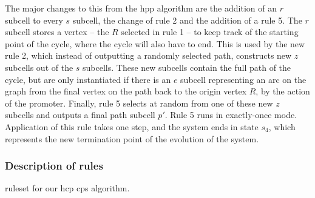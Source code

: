 The major changes to this from the \gls{hpp} algorithm are the addition of an \(r\) subcell to every \(s\) subcell, the change of rule 2 and the addition of a rule 5. The \(r\) subcell stores a vertex -- the \(R\) selected in rule 1 -- to keep track of the starting point of the cycle, where the cycle will also have to end.  This is used by the new rule 2, which instead of outputting a randomly selected path, constructs new \(z\) subcells out of the \(s\) subcells.  These new subcells contain the full path of the cycle, but are only instantiated if there is an \(e\) subcell representing an arc on the graph from the final vertex on the path back to the origin vertex \(R\), by the action of the promoter.  Finally, rule 5 selects at random from one of these new \(z\) subcells and outputs a final path subcell \(p'\).  Rule 5 runs in exactly-once mode.  Application of this rule takes one step, and the system ends in state \(s_4\), which represents the new termination point of the evolution of the system.

\subsubsection{Description of rules}

\begin{cprulesetfloat}
    \begin{cpruleset}
        
        
        
        
        
        
    \end{cpruleset}
    \caption[\Gls{ruleset} for the ]{\label{ruleset:tsp:hcp}\Gls{ruleset} for our \gls{hcp} \gls{cps} algorithm.}
\end{cprulesetfloat}


